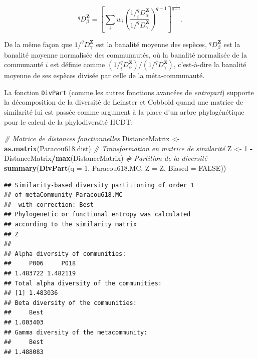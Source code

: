 \documentclass[
  11pt,
  french,
  a4paper,
  extrafontsizes,onecolumn,openright
  ]{memoir}
\newenvironment{Shaded}{\begin{snugshade}}{\end{snugshade}}
\newcommand{\CommentTok}[1]{\textcolor[rgb]{0.56,0.35,0.01}{\textit{#1}}}
\newcommand{\DataTypeTok}[1]{\textcolor[rgb]{0.13,0.29,0.53}{#1}}
\newcommand{\DecValTok}[1]{\textcolor[rgb]{0.00,0.00,0.81}{#1}}
\newcommand{\KeywordTok}[1]{\textcolor[rgb]{0.13,0.29,0.53}{\textbf{#1}}}
\newcommand{\NormalTok}[1]{#1}
\newcommand{\OperatorTok}[1]{\textcolor[rgb]{0.81,0.36,0.00}{\textbf{#1}}}
\newcommand{\OtherTok}[1]{\textcolor[rgb]{0.56,0.35,0.01}{#1}}
\newcommand{\StringTok}[1]{\textcolor[rgb]{0.31,0.60,0.02}{#1}}
\begin{document}
\begin{equation}
  \label{eq:Dbeta}
  ^q\!D^{\mathbf{Z}}_\beta
  ={\left[\sum_i{w_i}{\left(\frac{1/^q_i\!D^{\mathbf{Z}}_\alpha}{1/^q\!D^{\mathbf{Z}}_\gamma}\right)}^{q-1}\right]}^{\frac{1}{q-1}}.
\end{equation}

De la même façon que \(1/^q\!D^{\mathbf{Z}}_\gamma\) est la banalité moyenne des espèces, \(^q\!D^{\mathbf{Z}}_\beta\) est la banalité moyenne normalisée des communautés, où la banalité normalisée de la communauté \(i\) est définie comme \({\left(1/^q_i\!D^{\mathbf{Z}}_\alpha\right)}/{\left(1/^q\!D^{\mathbf{Z}}_\gamma\right)}\), c'est-à-dire la banalité moyenne de ses espèces divisée par celle de la méta-communauté.

La fonction \texttt{DivPart} (comme les autres fonctions avancées de \emph{entropart}) supporte la décomposition de la diversité de Leinster et Cobbold quand une matrice de similarité lui est passée comme argument à la place d'un arbre phylogénétique pour le calcul de la phylodiversité HCDT:

\scriptsize

\begin{Shaded}
\begin{Highlighting}[]
\CommentTok{# Matrice de distances fonctionnelles}
\NormalTok{DistanceMatrix <-}\StringTok{ }\KeywordTok{as.matrix}\NormalTok{(Paracou618.dist)}
\CommentTok{# Transformation en matrice de similarité}
\NormalTok{Z <-}\StringTok{ }\DecValTok{1} \OperatorTok{-}\StringTok{ }\NormalTok{DistanceMatrix}\OperatorTok{/}\KeywordTok{max}\NormalTok{(DistanceMatrix)}
\CommentTok{# Partition de la diversité}
\KeywordTok{summary}\NormalTok{(}\KeywordTok{DivPart}\NormalTok{(}\DataTypeTok{q =} \DecValTok{1}\NormalTok{, Paracou618.MC, }\DataTypeTok{Z =}\NormalTok{ Z, }\DataTypeTok{Biased =} \OtherTok{FALSE}\NormalTok{))}
\end{Highlighting}
\end{Shaded}

\begin{verbatim}
## Similarity-based diversity partitioning of order 1 
## of metaCommunity Paracou618.MC
##  with correction: Best
## Phylogenetic or functional entropy was calculated
## according to the similarity matrix 
## Z 
## 
## Alpha diversity of communities: 
##     P006     P018 
## 1.483722 1.482119 
## Total alpha diversity of the communities: 
## [1] 1.483036
## Beta diversity of the communities: 
##     Best 
## 1.003403 
## Gamma diversity of the metacommunity: 
##     Best 
## 1.488083
\end{verbatim}
\end{document}
